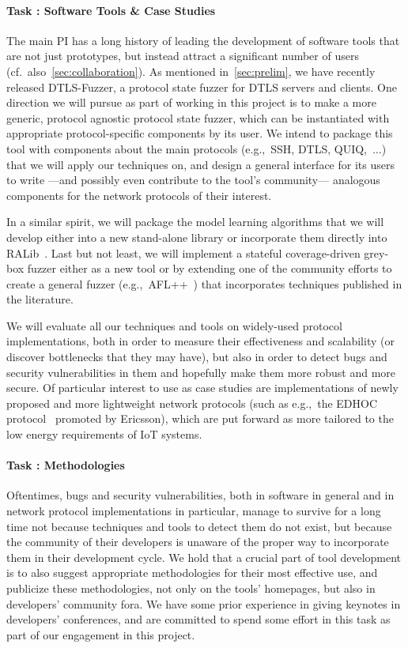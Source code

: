 \documentclass[11pt]{article}
\newcommand{\system}[1]{\mbox{\textsf{#1}}}
\newcounter{Task}
\newcommand{\task}[1]{\addtocounter{Task}{1}\paragraph{Task \theTask: #1}}
\newcommand{\significance}[1]{\vspace*{-0.5em}%
  \begin{quoting}\noindent\textbf{Significance:} #1\end{quoting}}
\newcommand{\myparagraph}{}
\let\myparagraph=\paragraph
\renewcommand{\paragraph}{\vspace{-3mm}\myparagraph}
\newcommand{\eg}{e.\/g.,\ }
\begin{document}
\task{Software Tools \& Case Studies}
The main PI has a long history of leading the development of software tools
that are not just prototypes, but instead attract a significant number of
users (cf.\ also~\cref{sec:collaboration}).
%
As mentioned in~\cref{sec:prelim}, we have recently released
\system{DTLS-Fuzzer}, a protocol state fuzzer for DTLS servers and clients.
One direction we will pursue as part of working in this project is to make a
more generic, protocol agnostic protocol state fuzzer, which can be
instantiated with appropriate protocol-specific components by its user.  We
intend to package this tool with components about the main protocols (\eg SSH,
DTLS, QUIQ,~$\ldots$) that we will apply our techniques on, and design a
general interface for its users to write ---and possibly even contribute to
the tool's community--- analogous components for the network protocols of
their interest.

In a similar spirit, we will package the model learning algorithms that we
will develop either into a new stand-alone library or incorporate them
directly into \system{RALib}~\cite{CasselHJS16}.
%
Last but not least, we will implement a stateful coverage-driven grey-box
fuzzer either as a new tool or by extending one of the community efforts to
create a general fuzzer (\eg \system{AFL++}~\cite{AFL++@Woot-20}) that
incorporates techniques published in the literature.

We will evaluate all our techniques and tools on widely-used protocol
implementations, both in order to measure their effectiveness and scalability
(or discover bottlenecks that they may have), but also in order to detect bugs
and security vulnerabilities in them and hopefully make them more robust and
more secure. Of particular interest to use as case studies are implementations
of newly proposed and more lightweight network protocols (such as \eg the
EDHOC protocol~\cite{ietf-lake-edhoc-18} promoted by Ericsson), which are put
forward as more tailored to the low energy requirements of IoT systems.


\task{Methodologies}
Oftentimes, bugs and security vulnerabilities, both in software in general and
in network protocol implementations in particular, manage to survive for a
long time not because techniques and tools to detect them do not exist, but
because the community of their developers is unaware of the proper way to
incorporate them in their development cycle. We hold that a crucial part of
tool development is to also suggest appropriate methodologies for their most
effective use, and publicize these methodologies, not only on the tools'
homepages, but also in developers' community fora. We have some prior
experience in giving keynotes in developers' conferences, and are committed to
spend some effort in this task as part of our engagement in this project.
\end{document}
